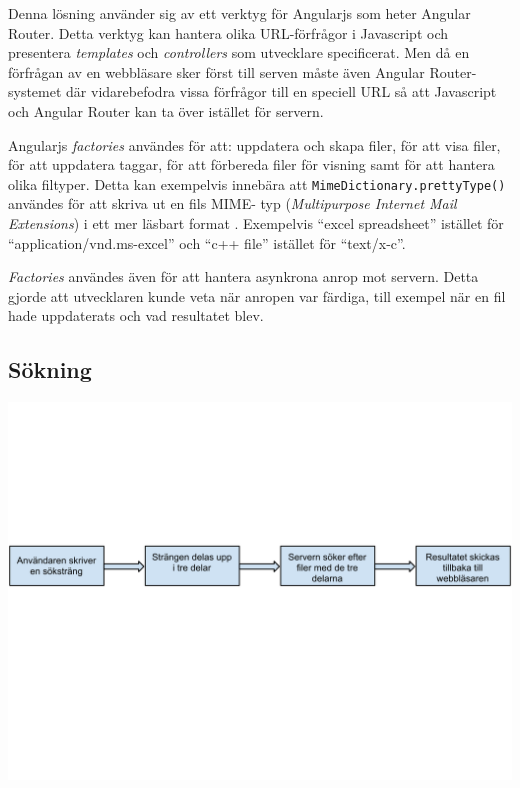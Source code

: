 Denna lösning använder sig av ett verktyg för Angularjs som heter Angular
Router. Detta verktyg kan hantera olika URL-förfrågor i Javascript och
presentera \emph{templates} och \emph{controllers} som utvecklare specificerat.
Men då en förfrågan av en webbläsare sker först till serven måste även Angular
Router-systemet där vidarebefodra vissa förfrågor till en speciell URL så att
Javascript och Angular Router kan ta över istället för servern.

Angularjs \emph{factories} användes för att: uppdatera och skapa filer, för att visa
filer, för att uppdatera taggar, för att förbereda filer för visning samt för
att hantera olika filtyper. Detta kan exempelvis innebära att
\texttt{MimeDictionary.prettyType()} användes för att skriva ut en fils MIME-
typ (\emph{Multipurpose Internet Mail Extensions}) i ett mer läsbart format
\cite{mime}. Exempelvis ``excel spreadsheet'' istället för
``application/vnd.ms-excel'' och ``c++ file'' istället för ``text/x-c''.

\emph{Factories} användes även för att hantera asynkrona anrop mot servern.
Detta gjorde att utvecklaren kunde veta när anropen var färdiga, till exempel
när en fil hade uppdaterats och vad resultatet blev.

\subsection{Sökning}

\begin{Figure}
  \centering
    \includegraphics[width=0.9\linewidth]{figures/search.pdf}
\end{Figure}

